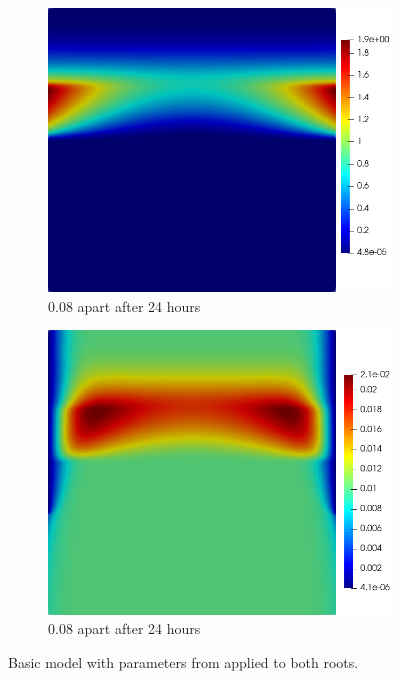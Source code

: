 \documentclass[11pt]{article}
\numberwithin{equation}{section}
\begin{document}
 \begin{figure}[h]
     \centering
     \begin{subfigure}[t]{0.35\textwidth}\centering
     \includegraphics[width=\textwidth]{Figures/testpics/BasicDMA.png}
     \caption{0.08 apart  after 24 hours}
     \end{subfigure}
     \hspace{1cm}
     \begin{subfigure}[t]{0.35\textwidth}\centering
     \includegraphics[width=\textwidth]{Figures/testpics/BasicZn.png}
     \caption{0.08 apart  after 24 hours}
     \end{subfigure}
     \caption{Basic model with parameters from \cite{Ptashnyk-2011} applied to both roots.}
 \end{figure}
 
\end{document}
